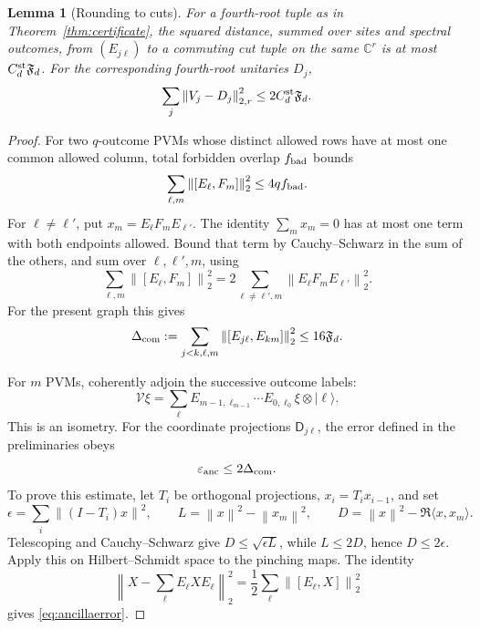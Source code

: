 \documentclass[11pt]{amsart}
\newtheorem{lemma}[theorem]{Lemma}
\theoremstyle{remark}
\theoremstyle{plain}
\numberwithin{equation}{section}
\newcommand{\C}{\mathbb C}
\newcommand{\ket}[1]{\lvert#1\rangle}
\newcommand{\norm}[1]{\left\|#1\right\|}
\newcommand{\ip}[2]{\langle#1,#2\rangle}
\newcommand{\Fdef}{\mathfrak F_d}
\newcommand{\epsanc}{\varepsilon_{\rm anc}}
\begin{document}
\begin{lemma}[Rounding to cuts]\label{lem:rounding}
For a fourth-root tuple as in Theorem~\ref{thm:certificate}, the
squared distance, summed over sites and spectral outcomes, from
\((E_{j\ell})\) to a commuting cut tuple on the same \(\C^r\) is at
most \(C_d^{\rm st}\Fdef\).
For the corresponding fourth-root unitaries \(D_j\),
\[
 \sum_j\norm{V_j-D_j}_{2,r}^2\le2C_d^{\rm st}\Fdef.
\]
\end{lemma}

\begin{proof}
For two \(q\)-outcome PVMs whose distinct allowed rows have at most
one common allowed column, total forbidden overlap \(f_{\rm bad}\)
bounds
\[
 \sum_{\ell,m}\norm{[E_\ell,F_m]}_2^2\le4qf_{\rm bad}.
\]
For \(\ell\ne\ell'\), put \(x_m=E_\ell F_mE_{\ell'}\).
The identity \(\sum_mx_m=0\) has at most one term with both endpoints
allowed. Bound that term by Cauchy--Schwarz in the sum of the others,
and sum over \(\ell,\ell',m\), using
\[
 \sum_{\ell,m}\norm{[E_\ell,F_m]}_2^2
 =2\sum_{\ell\ne\ell',m}\norm{E_\ell F_mE_{\ell'}}_2^2.
\]
For the present graph this gives
\begin{equation}\label{eq:commutators}
 \Delta_{\rm com}:=
 \sum_{j<k,\ell,m}\norm{[E_{j\ell},E_{km}]}_2^2
 \le16\Fdef.
\end{equation}

For \(m\) PVMs, coherently adjoin the successive outcome labels:
\[
 \mathcal V\xi=
 \sum_{\boldsymbol\ell}
 E_{m-1,\ell_{m-1}}\cdots E_{0,\ell_0}\xi
 \otimes\ket{\boldsymbol\ell}.
\]
This is an isometry. For the coordinate projections
\(\mathsf D_{j\ell}\), the error defined in the preliminaries obeys
\begin{equation}\label{eq:ancillaerror}
 \epsanc\le2\Delta_{\rm com}.
\end{equation}
To prove this estimate, let \(T_i\) be orthogonal projections,
\(x_i=T_ix_{i-1}\), and set
\[
 \epsilon=\sum_i\norm{(I-T_i)x}^2,\qquad
 L=\norm x^2-\norm{x_m}^2,\qquad
 D=\norm x^2-\Re\ip{x}{x_m}.
\]
Telescoping and Cauchy--Schwarz give
\(D\le\sqrt{\epsilon L}\), while \(L\le2D\), hence \(D\le2\epsilon\).
Apply this on Hilbert--Schmidt space to the pinching maps.
The identity
\[
 \norm{X-\sum_\ell E_\ell XE_\ell}_2^2
 =\frac12\sum_\ell\norm{[E_\ell,X]}_2^2
\]
gives \eqref{eq:ancillaerror}.


\end{proof}
\end{document}
